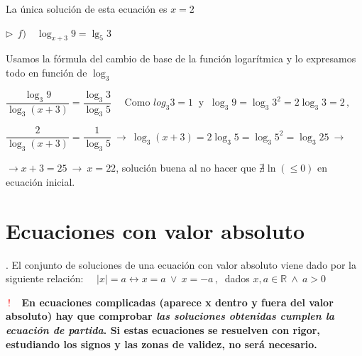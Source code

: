 \begin{miejercicio}
\vspace{2mm} La única solución de esta ecuación es $x=2$

\vspace{5mm} $\triangleright \ \ f) \quad  \log_{x+3}9=\lg_5 3$
	
\vspace{2mm} Usamos la fórmula del cambio de base de la función logarítmica y lo expresamos todo en función de $\log_3$

\vspace{2mm} $\dfrac{\log_3 9}{\log_3(x+3)}=\dfrac{\log_3 3}{\log_3 5}\quad  $ Como $log_3 3=1 \ $ y $ \ \log_3 9=\log_3 3^2=2\log_3 3=2\, , \ $

\vspace{2mm} $ \dfrac{2}{\log_3(x+3)}=\dfrac{1}{\log_3 5} \ \to \ \log_3(x+3)=2\log_3 5=\log_3 5^2=\log_3 25 \ \to $

\vspace{2mm} $\to x+3=25 \ \to \ x=22$, solución buena al no hacer que $\nexists \ln(\le 0)$ en ecuación inicial.


\end{miejercicio}

\vspace{1cm}
\section{Ecuaciones con valor absoluto}
\vspace{0.5cm}

\begin{definition}

\begin{theorem}[ Resolución]
. El conjunto de soluciones de una ecuación con valor absoluto viene dado por la siguiente relación:
$\quad |x| = a      \leftrightarrow       x = a    \ \vee \     x = - a\, , \  $
dados $x , a \in \mathbb R  \ \wedge \   a > 0 $
\end{theorem}

\vspace{5mm} 
\begin{destacado}
\begin{small}
 \textcolor{red}{$\boldsymbol{\boxed{ \ ! \ }} $}  $\ $ \textbf{En ecuaciones complicadas (aparece x dentro y fuera del valor absoluto) hay que comprobar \emph{las soluciones obtenidas cumplen la ecuación de partida}. Si estas ecuaciones se resuelven con rigor, estudiando los signos y las zonas de validez, no será necesario.}
 \end{small}
 \end{destacado}
\end{definition}

